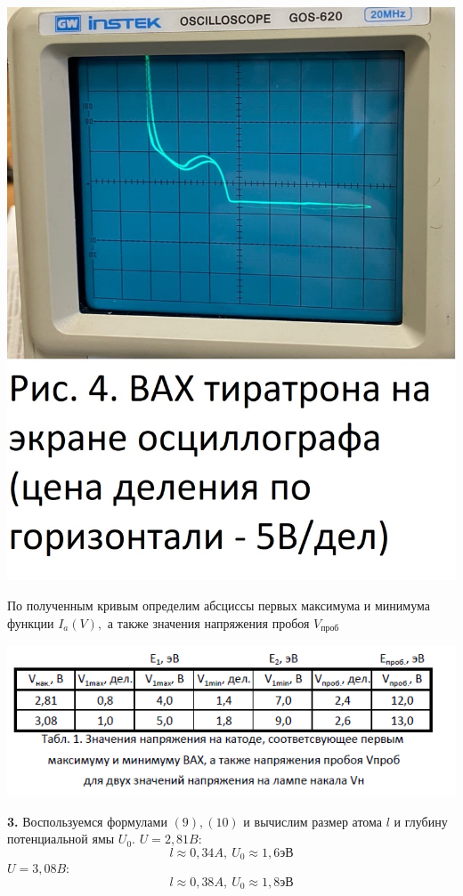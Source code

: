 \documentclass[a4paper,12pt]{article}
\begin{document}
\begin{center}
	\includegraphics[height=13\baselineskip]{vakh.jpg}
\end{center}	
	
 По полученным кривым определим абсциссы первых максимума и минимума функции $I_a(V),$ а также значения напряжения пробоя $V_{\text{проб}}$
	
	\includegraphics[width=\linewidth]{tabl1.png}
	
	{\bf 3.} Воспользуемся формулами $(9), (10)$ и вычислим размер атома $l$ и глубину потенциальной ямы $U_0$.
	$U = 2,81B:$
	$$l \approx 0,34A, \ U_0 \approx 1,6\text{эВ}$$
	$U = 3,08B:$
	$$l \approx 0,38A, \ U_0 \approx 1,8\text{эВ}$$
	
\end{document}
